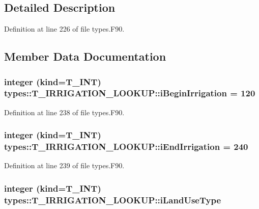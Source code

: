 \subsection{Detailed Description}


Definition at line 226 of file types.F90.



\subsection{Member Data Documentation}
\hypertarget{typetypes_1_1_t___i_r_r_i_g_a_t_i_o_n___l_o_o_k_u_p_acf2ac0250419510caa9e365ab59ed32b}{
\subsubsection[{iBeginIrrigation}]{\setlength{\rightskip}{0pt plus 5cm}integer (kind={\bf T\_\-INT}) {\bf types::T\_\-IRRIGATION\_\-LOOKUP::iBeginIrrigation} = 120}}
\label{typetypes_1_1_t___i_r_r_i_g_a_t_i_o_n___l_o_o_k_u_p_acf2ac0250419510caa9e365ab59ed32b}


Definition at line 238 of file types.F90.

\hypertarget{typetypes_1_1_t___i_r_r_i_g_a_t_i_o_n___l_o_o_k_u_p_a5a277d72ee562073cd0bf1693ccf59f0}{
\subsubsection[{iEndIrrigation}]{\setlength{\rightskip}{0pt plus 5cm}integer (kind={\bf T\_\-INT}) {\bf types::T\_\-IRRIGATION\_\-LOOKUP::iEndIrrigation} = 240}}
\label{typetypes_1_1_t___i_r_r_i_g_a_t_i_o_n___l_o_o_k_u_p_a5a277d72ee562073cd0bf1693ccf59f0}


Definition at line 239 of file types.F90.

\hypertarget{typetypes_1_1_t___i_r_r_i_g_a_t_i_o_n___l_o_o_k_u_p_a80e356e4bb51b1d7e76d6b68713a8c58}{
\subsubsection[{iLandUseType}]{\setlength{\rightskip}{0pt plus 5cm}integer (kind={\bf T\_\-INT}) {\bf types::T\_\-IRRIGATION\_\-LOOKUP::iLandUseType}}}
\label{typetypes_1_1_t___i_r_r_i_g_a_t_i_o_n___l_o_o_k_u_p_a80e356e4bb51b1d7e76d6b68713a8c58}


